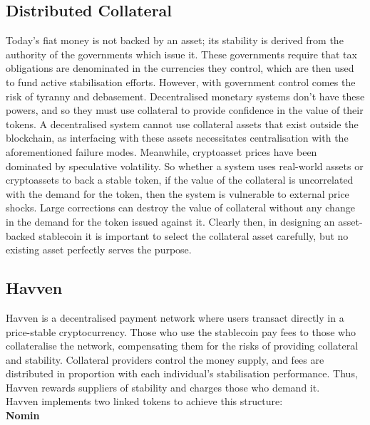 \subsection{Distributed Collateral}

\noindent Today’s fiat money is not backed by an asset; its stability is derived from the authority of the governments which issue it. These governments require that tax obligations are denominated in the currencies they control, which are then used to fund active stabilisation efforts. However, with government control comes the risk of tyranny and debasement. Decentralised monetary systems don’t have these powers, and so they must use collateral to provide confidence in the value of their tokens. A decentralised system cannot use collateral assets that exist outside the blockchain, as interfacing with these assets necessitates centralisation with the aforementioned failure modes. Meanwhile, cryptoasset prices have been dominated by speculative volatility. So whether a system uses real-world assets or cryptoassets to back a stable token, if the value of the collateral is uncorrelated with the demand for the token, then the system is vulnerable to external price shocks. Large corrections can destroy the value of collateral without any change in the demand for the token issued against it. Clearly then, in designing an asset-backed stablecoin it is important to select the collateral asset carefully, but no existing asset perfectly serves the purpose.

\subsection{Havven}

\noindent Havven is a decentralised payment network where users transact directly in a price-stable cryptocurrency. Those who use the stablecoin pay fees to those who collateralise the network, compensating them for the risks of providing collateral and stability. Collateral providers control the money supply, and fees are distributed in proportion with each individual’s stabilisation performance. Thus, Havven rewards suppliers of stability and charges those who demand it. \\

\noindent Havven implements two linked tokens to achieve this structure: \\

\noindent \textbf{Nomin}

\vspace{1mm}

